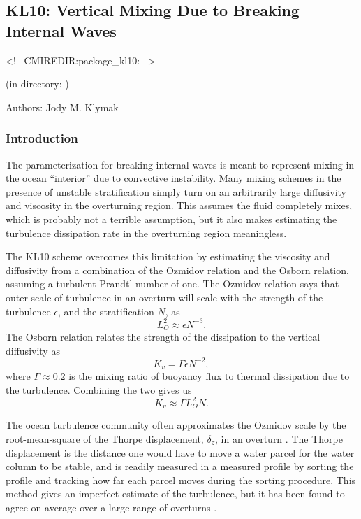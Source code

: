 \subsection{KL10: Vertical Mixing Due to Breaking Internal Waves}
\label{sec:pkg:kl10}
\begin{rawhtml}
<!-- CMIREDIR:package_kl10: -->
\end{rawhtml}
\begin{center}
(in directory: )
\end{center}

Authors: Jody M. Klymak

\subsubsection{Introduction
\label{sec:pkg:kl10:intro}}

The \citet[][KL10]{klymaklegg10} parameterization for breaking internal waves is meant to represent mixing in the ocean ``interior'' due to convective instability.   Many mixing schemes in the presence of unstable stratification simply turn on an arbitrarily large diffusivity and viscosity in the overturning region.  This assumes the fluid completely mixes, which is probably not a terrible assumption, but it also makes estimating the turbulence dissipation rate in the overturning region meaningless.

The KL10 scheme overcomes this limitation by estimating the viscosity and diffusivity from a combination of the Ozmidov relation and the Osborn relation, assuming a turbulent Prandtl number of one.  The Ozmidov relation says that outer scale of turbulence in an overturn will scale with the strength of the turbulence $\epsilon$, and the stratification $N$, as
\begin{equation}
\label{eq:pkg:kl10:Lo}
  L_O^2 \approx \epsilon N^{-3}.
\end{equation}
The Osborn relation relates the strength of the dissipation to the vertical diffusivity as
\begin{equation}
  K_{v}=\Gamma \epsilon N^{-2},
\end{equation}
where $\Gamma\approx 0.2$ is the mixing ratio of buoyancy flux to thermal dissipation due to the turbulence.  Combining the two  gives us
\begin{equation}
  K_{v} \approx \Gamma L_O^2 N.
\end{equation}

The ocean turbulence community often approximates the Ozmidov scale by the root-mean-square of the Thorpe displacement, $\delta_z$, in an overturn \citep{thorpe77}.  The Thorpe displacement is the distance one would have to move a water parcel for the water column to be stable, and is readily measured in a measured profile by sorting the profile and tracking how far each parcel moves during the sorting procedure.  This method gives an imperfect estimate of the turbulence, but it has been found to agree on average over a large range of overturns
\citep{wesson94,moum96}.

